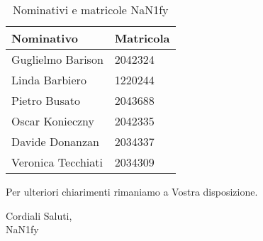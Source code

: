 \begin{table}[ht!]
		\centering
		\begin{tabular}{p{3cm} p{3cm}}
			\toprule
			\textbf{Nominativo} & \textbf{Matricola} \\
			\midrule
			Guglielmo Barison & 2042324 \\
			Linda Barbiero &  1220244 \\
			Pietro Busato & 2043688 \\
			Oscar Konieczny & 2042335 \\
			Davide Donanzan & 2034337 \\
			Veronica Tecchiati & 2034309 \\
			\bottomrule
		\end{tabular}
		\caption{Nominativi e matricole NaN1fy}
		\label{table:Nominativi e matricole NaN1fy}
\end{table}
Per ulteriori chiarimenti rimaniamo a Vostra disposizione.
\vspace{1em}
\begin{flushleft}
	Cordiali Saluti,\\
	NaN1fy
\end{flushleft}